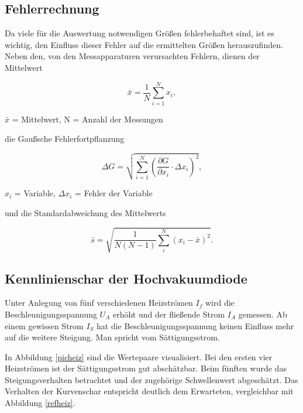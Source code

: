 \subsection{Fehlerrechnung}
Da viele für die Auswertung notwendigen Größen fehlerbehaftet sind, ist es wichtig, den Einfluss dieser Fehler auf die ermittelten
Größen herauszufinden. Neben den, von den Messapparaturen verursachten Fehlern, dienen der Mittelwert
\begin{formel}
\begin{equation}
 \bar{x} = \frac1N \sum_{i=1}^{N} x_i,
\end{equation}
\caption*{\small{$\bar{x}$ = Mittelwert, N = Anzahl der Messungen}}
\end{formel}

die Gaußsche Fehlerfortpflanzung

\begin{formel}
\begin{equation}
\Delta G = \sqrt{\sum_{i=1}^{N}\left( \frac{\partial G}{\partial x_i}\cdot \Delta x_i\right)^2},
\label{gauss}
\end{equation}
\caption*{$x_i$ = Variable, $\Delta x_i$ = Fehler der Variable}
\end{formel}

und die Standardabweichung des Mittelwerts

\begin{equation}
 \bar s = \sqrt{\frac{1}{N(N-1)} \sum_{i}^{N} (x_i - \bar{x})^2}.
\end{equation}

\subsection{Kennlinienschar der Hochvakuumdiode}
\label{a}
Unter Anlegung von fünf verschiedenen Heizströmen $I_f$ wird die Beschleunigungsspannung $U_A$ erhöht und der fließende Strom $I_A$ 
gemessen. Ab einem gewissen Strom $I_S$ hat die Beschleunigungsspannung keinen Einfluss mehr auf die weitere Steigung. Man spricht vom
Sättigungsstrom.

In Abbildung \ref{picheiz} sind die Wertepaare visualisiert. Bei den ersten vier Heizströmen ist der Sättigungsstrom gut abschätzbar.
Beim fünften wurde das Steigungsverhalten betrachtet und der zugehörige Schwellenwert abgeschätzt. Das Verhalten der Kurvenschar 
entspricht deutlich dem Erwarteten, vergleichbar mit Abbildung \ref{refheiz}.


